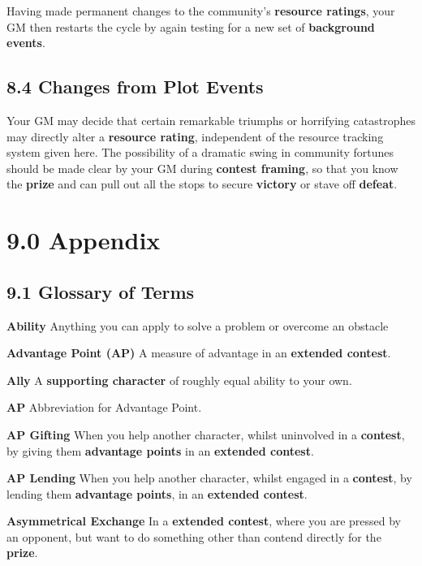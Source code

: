 \documentclass[
]{article}
\begin{document}
Having made permanent changes to the community's \textbf{resource
ratings}, your GM then restarts the cycle by again testing for a new set
of \textbf{background events}.

\hypertarget{changes-from-plot-events}{%
\subsection{8.4 Changes from Plot
Events}\label{changes-from-plot-events}}

Your GM may decide that certain remarkable triumphs or horrifying
catastrophes may directly alter a \textbf{resource rating}, independent
of the resource tracking system given here. The possibility of a
dramatic swing in community fortunes should be made clear by your GM
during \textbf{contest framing}, so that you know the \textbf{prize} and
can pull out all the stops to secure \textbf{victory} or stave off
\textbf{defeat}.

\hypertarget{appendix}{%
\section{9.0 Appendix}\label{appendix}}

\hypertarget{glossary-of-terms}{%
\subsection{9.1 Glossary of Terms}\label{glossary-of-terms}}

\textbf{Ability} Anything you can apply to solve a problem or overcome
an obstacle

\textbf{Advantage Point (AP)} A measure of advantage in an
\textbf{extended contest}.

\textbf{Ally} A \textbf{supporting character} of roughly equal ability
to your own.

\textbf{AP} Abbreviation for Advantage Point.

\textbf{AP Gifting} When you help another character, whilst uninvolved
in a \textbf{contest}, by giving them \textbf{advantage points} in an
\textbf{extended contest}.

\textbf{AP Lending} When you help another character, whilst engaged in a
\textbf{contest}, by lending them \textbf{advantage points}, in an
\textbf{extended contest}.

\textbf{Asymmetrical Exchange} In a \textbf{extended contest}, where you
are pressed by an opponent, but want to do something other than contend
directly for the \textbf{prize}.
\end{document}
